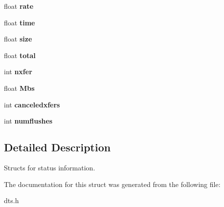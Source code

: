 \begin{CompactItemize}
\item 
\hypertarget{structqStat_20072aa3e83ce55611275e4f94252faf}{
float \textbf{rate}}
\label{structqStat_20072aa3e83ce55611275e4f94252faf}

\item 
\hypertarget{structqStat_1ae21d283db5cfee7641c1956b3a23de}{
float \textbf{time}}
\label{structqStat_1ae21d283db5cfee7641c1956b3a23de}

\item 
\hypertarget{structqStat_60e53466f8f0d8c2454c39f86a920507}{
float \textbf{size}}
\label{structqStat_60e53466f8f0d8c2454c39f86a920507}

\item 
\hypertarget{structqStat_97c2d7be5e29cf18eff9792a6d16396f}{
float \textbf{total}}
\label{structqStat_97c2d7be5e29cf18eff9792a6d16396f}

\item 
\hypertarget{structqStat_9c37c2dc9d5722dc56b034d8ec6dca5b}{
int \textbf{nxfer}}
\label{structqStat_9c37c2dc9d5722dc56b034d8ec6dca5b}

\item 
\hypertarget{structqStat_71dd2137c34029e5a5d6628fb41a0f78}{
float \textbf{Mbs}}
\label{structqStat_71dd2137c34029e5a5d6628fb41a0f78}

\item 
\hypertarget{structqStat_d39ca881fe8abfa90c9300f081e82828}{
int \textbf{canceledxfers}}
\label{structqStat_d39ca881fe8abfa90c9300f081e82828}

\item 
\hypertarget{structqStat_101ff6c9b35da4707f0766bf9783a37c}{
int \textbf{numflushes}}
\label{structqStat_101ff6c9b35da4707f0766bf9783a37c}

\end{CompactItemize}


\subsection{Detailed Description}
Structs for status information. 

The documentation for this struct was generated from the following file:\begin{CompactItemize}
\item 
dts.h\end{CompactItemize}
